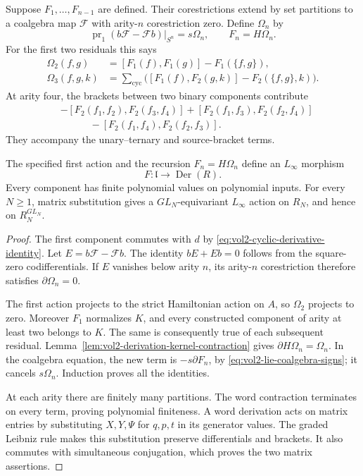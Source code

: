 Suppose $F_1,\ldots,F_{n-1}$ are defined. Their corestrictions
extend by set partitions to a coalgebra map $\mathcal F$ with
arity-$n$ corestriction zero. Define $\Omega_n$ by
\[
 \operatorname{pr}_1(b\mathcal F-\mathcal F b)\big|_{S^n}
     =s\Omega_n,
 \qquad F_n=H\Omega_n.
\]
For the first two residuals this says
\begin{align}
 \Omega_2(f,g)
    &=[F_1(f),F_1(g)]-F_1(\{f,g\}),
       \label{eq:vol2-action-second-residual}\\
 \Omega_3(f,g,k)
    &=\sum_{\mathrm{cyc}}
       \bigl([F_1(f),F_2(g,k)]-F_2(\{f,g\},k)\bigr).
       \label{eq:vol2-action-third-residual}
\end{align}
At arity four, the brackets between two binary components contribute
\begin{equation}\label{eq:vol2-action-fourth-binary-part}
 \begin{aligned}
 &-[F_2(f_1,f_2),F_2(f_3,f_4)]
   +[F_2(f_1,f_3),F_2(f_2,f_4)]\\
 &\hspace{3em}-[F_2(f_1,f_4),F_2(f_2,f_3)].
 \end{aligned}
\end{equation}
They accompany the unary--ternary and source-bracket terms.

\begin{theorem}\label{thm:vol2-all-arity-derived-action}
The specified first action and the recursion $F_n=H\Omega_n$
define an $L_\infty$ morphism
\[
 F:\mathfrak l\longrightarrow\operatorname{Der}(R).
\]
Every component has finite polynomial values on polynomial
inputs. For every $N\geq1$, matrix substitution gives a
$GL_N$-equivariant $L_\infty$ action on $R_N$, and hence on
$R_N^{GL_N}$.
\end{theorem}
\begin{proof}
The first component commutes with $d$ by
\eqref{eq:vol2-cyclic-derivative-identity}. Let
$E=b\mathcal F-\mathcal F b$. The identity
$bE+Eb=0$ follows from the square-zero codifferentials.
If $E$ vanishes below arity $n$, its arity-$n$ corestriction
therefore satisfies $\partial\Omega_n=0$.

The first action projects to the strict Hamiltonian action on
$A$, so $\Omega_2$ projects to zero. Moreover $F_1$ normalizes
$K$, and every constructed component of arity at least two
belongs to $K$. The same is consequently true of each subsequent
residual. Lemma~\ref{lem:vol2-derivation-kernel-contraction}
gives $\partial H\Omega_n=\Omega_n$. In the coalgebra equation,
the new term is $-s\partial F_n$, by
\eqref{eq:vol2-lie-coalgebra-signs}; it cancels $s\Omega_n$.
Induction proves all the identities.

At each arity there are finitely many partitions. The word
contraction terminates on every term, proving polynomial
finiteness. A word derivation acts on matrix entries by
substituting $X,Y,\Psi$ for $q,p,t$ in its generator values.
The graded Leibniz rule makes this substitution preserve
differentials and brackets. It also commutes with simultaneous
conjugation, which proves the two matrix assertions.
\end{proof}

